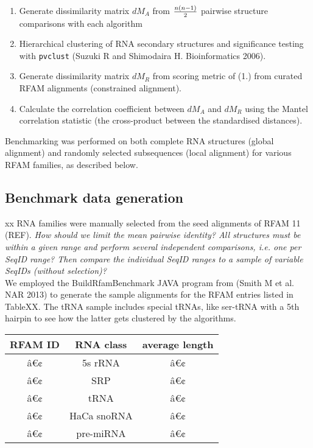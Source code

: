 \documentclass[a4paper,twoside]{article}
\newcommand\pvclust{\texttt{pvclust}}
\begin{document}
\begin{enumerate}
\item Generate dissimilarity matrix $dM_A$ from ${n(n-1)}\over{2}$ pairwise structure comparisons with each algorithm
\item Hierarchical clustering of RNA secondary structures and significance testing with \pvclust{} (Suzuki R and Shimodaira H. Bioinformatics 2006).
\item Generate dissimilarity matrix $dM_R$ from scoring metric of (1.) from curated RFAM alignments (constrained alignment). 
\item Calculate the correlation coefficient between $dM_A$ and $dM_R$ using the Mantel correlation statistic (the cross-product between the standardised distances). 
\end{enumerate}

Benchmarking was performed on both complete RNA structures (global alignment) and randomly selected subsequences (local alignment) for various RFAM families, as described below. \\


\subsection{Benchmark data generation} 

xx RNA families were manually selected from the seed alignments of RFAM 11 (REF). \textit{How should we limit the mean pairwise identity? All structures must be within a given range and perform several independent comparisons, i.e. one per SeqID range? Then compare the individual SeqID ranges to a sample of variable SeqIDs (without selection)?}\\

We employed the BuildRfamBenchmark JAVA program from (Smith M et al. NAR 2013) to generate the sample alignments for the RFAM entries listed in TableXX. The tRNA sample includes special tRNAs, like ser-tRNA with a 5th hairpin to see how the latter gets clustered by the algorithms. \\

\begin{tabular}{|c|c|c|}
\hline 
\textbf{RFAM ID} & \textbf{RNA class} & \textbf{average length} \\ 
\hline 
â€¢ & 5s rRNA & â€¢ \\ 
â€¢ & SRP & â€¢ \\ 
â€¢ & tRNA & â€¢ \\ 
â€¢ & HaCa snoRNA & â€¢ \\ 
â€¢ & pre-miRNA & â€¢ \\ 
\hline 
\end{tabular} 
\end{document}
